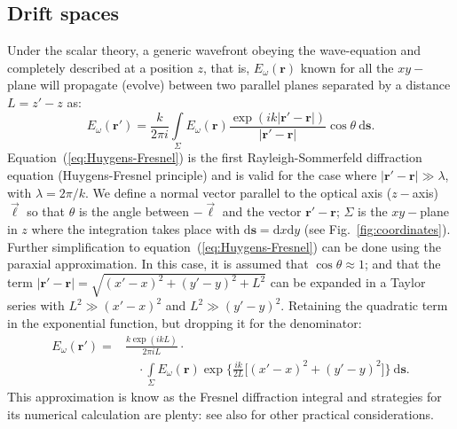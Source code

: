 \documentclass{iucr}              %
\begin{document}
\subsection{Drift spaces}\label{sec:free_space}

Under the scalar theory, a generic wavefront obeying the wave-equation and completely described at a position $z$, that is, $E_\omega(\textbf{r})$ known for all the $xy-$plane will propagate (evolve) between two parallel planes separated by a distance $L=z'-z$ as: 
\begin{equation}\label{eq:Huygens-Fresnel}
    E_\omega(\textbf{r}') = \frac{k}{2\pi i}\int\limits_{\Sigma}{E_\omega(\textbf{r})\frac{\exp{(ik\vert\textbf{r}' - \textbf{r}\vert)}}{\vert\textbf{r}' - \textbf{r}\vert}\cos{\theta}~\mathrm{d}\textbf{s}}.
\end{equation}
Equation~(\ref{eq:Huygens-Fresnel}) is the first Rayleigh-Sommerfeld diffraction equation (Huygens-Fresnel principle) and is valid for the case where $\vert\textbf{r}' - \textbf{r}\vert\gg\lambda$, with $\lambda=2\pi \big/ k$. We define a normal vector parallel to the optical axis ($z-$axis) $\vec{\ell}$ so that $\theta$ is the angle between $-\vec{\ell}$ and the vector $\textbf{r}'-\textbf{r}$; $\Sigma$ is the $xy-$plane in $z$ where the integration takes place with $\mathrm{d}\textbf{s}=\mathrm{d}x\mathrm{d}y$ (see Fig.~\ref{fig:coordinates}). Further simplification to equation~(\ref{eq:Huygens-Fresnel}) can be done using the paraxial approximation. In this case, it is assumed that $\cos{\theta}\approx1$; and that the term $\vert\textbf{r}' - \textbf{r}\vert=\sqrt{(x'-x)^2 + (y'-y)^2 + L^2}$ can be expanded in a Taylor series with $L^2\gg(x'-x)^2$ and $L^2\gg(y'-y)^2$. Retaining the quadratic term in the exponential function, but dropping it for the denominator:
\begin{equation}\label{eq:Fresnel}
\begin{split}
    E_\omega(\textbf{r}') = &\frac{k\exp{(ikL)}}{2\pi i L}\cdot \\
    &\quad\cdot\int\limits_{\Sigma}{E_\omega(\textbf{r})\exp{\bigg\{ \frac{ik}{2L}\big[ (x'-x)^2 + (y'-y)^2 \big]\bigg\}}~\mathrm{d}\textbf{s}}.
\end{split}
\end{equation}
This approximation is know as the Fresnel diffraction integral and strategies for its numerical calculation are plenty: \cite{Kelly2014,Goodman2017} see also \cite{Rees87, Stern2004, Zhang2020} for other practical considerations.
\end{document}
